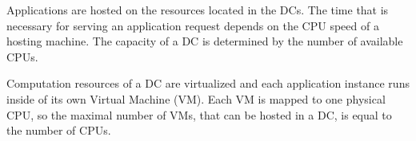 
Applications are hosted on the resources located in the \ac{DC}s.
The time that is necessary for serving an application request depends on the CPU speed of a hosting machine.
The capacity of a \ac{DC} is determined by the number of available CPUs. 


Computation resources of a \ac{DC} are virtualized and each application instance runs inside of its own Virtual Machine (VM). Each VM is mapped to one physical CPU, so the maximal number of VMs, that can be hosted in a \ac{DC}, is equal to the number of CPUs.

